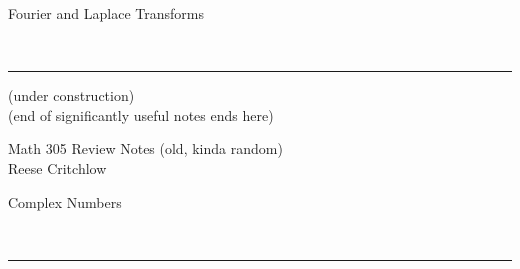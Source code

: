 \documentclass{article}
\makeatletter
\newcommand{\header}[1]{\begin{large}\noindent #1\end{large}\\\rule{\textwidth}{0.5pt}}
\newcommand{\sheader}[1]{\underline{#1:}}
\newcommand{\subcell}[2]{\begin{tabular}{@{}c@{}}#1 \\ #2\end{tabular}}
\makeatother
\begin{document}
    \header{Fourier and Laplace Transforms} 
    (under construction)\\
    (end of significantly useful notes ends here)









    \pagebreak 
    \begin{center}
        \Large Math 305 Review Notes (old, kinda random)\\
        \normalsize Reese Critchlow
    \end{center}

    \header{Complex Numbers}
\end{document}

